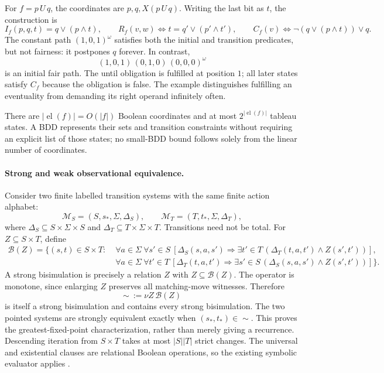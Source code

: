 For \(f=p\,U\,q\), the coordinates are \(p,q,X(p\,U\,q)\).
Writing the last bit as \(t\), the construction is
\[
 I_f(p,q,t)=q\lor(p\land t),\qquad
 R_f(v,w)\iff t=q'\lor(p'\land t'),\qquad
 C_f(v)\iff\neg(q\lor(p\land t))\lor q.
\]
The constant path \((1,0,1)^\omega\) satisfies both the initial
and transition predicates, but not fairness: it postpones \(q\)
forever. In contrast,
\[
 (1,0,1)\,(0,1,0)\,(0,0,0)^\omega
\]
is an initial fair path. The until obligation is fulfilled at
position \(1\); all later states satisfy \(C_f\) because the
obligation is false. The example distinguishes fulfilling an
eventuality from demanding its right operand infinitely often.

There are \(|\operatorname{el}(f)|=O(|f|)\) Boolean coordinates
and at most \(2^{|\operatorname{el}(f)|}\) tableau states. A BDD
represents their sets and transition constraints without requiring
an explicit list of those states; no small-BDD bound follows
solely from the linear number of coordinates.

\paragraph{Strong and weak observational equivalence.}
Consider two finite labelled transition systems with the same finite
action alphabet:
\[
 \mathcal M_S=(S,s_*,\Sigma,\Delta_S),\qquad
 \mathcal M_T=(T,t_*,\Sigma,\Delta_T),
\]
where \(\Delta_S\subseteq S\times\Sigma\times S\) and
\(\Delta_T\subseteq T\times\Sigma\times T\). Transitions need not
be total. For \(Z\subseteq S\times T\), define
\[
\begin{split}
 \mathcal B(Z)=\{(s,t)\in S\times T:\;&
   \forall a\in\Sigma\ \forall s'\in S\
     [\Delta_S(s,a,s')\Rightarrow
       \exists t'\in T\,(\Delta_T(t,a,t')\land Z(s',t'))],\\
 &\forall a\in\Sigma\ \forall t'\in T\
     [\Delta_T(t,a,t')\Rightarrow
       \exists s'\in S\,(\Delta_S(s,a,s')\land Z(s',t'))]\}.
\end{split}
\]
A strong bisimulation is precisely a relation \(Z\) with
\(Z\subseteq\mathcal B(Z)\). The operator is monotone, since enlarging
\(Z\) preserves all matching-move witnesses. Therefore
\[
 {\sim}\ :=\nu Z\,\mathcal B(Z)
\]
is itself a strong bisimulation and contains every strong bisimulation.
The two pointed systems are strongly equivalent exactly when
\((s_*,t_*)\in{\sim}\). This proves the greatest-fixed-point
characterization, rather than merely giving a recurrence.
Descending iteration from \(S\times T\) takes at most \(|S||T|\)
strict changes. The universal and existential clauses are relational
Boolean operations, so the existing symbolic evaluator applies
\cite[\S8.1]{BurchEtAl1992}.

